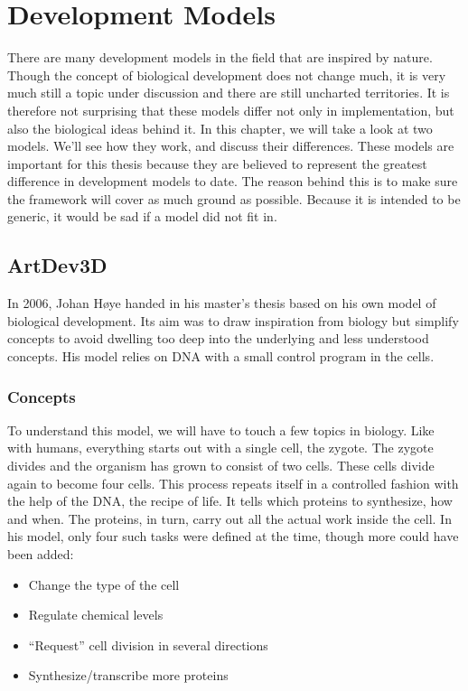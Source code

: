 \section{Development Models}
There are many development models in the field that are inspired by nature. Though the concept of biological development does not change much, it is very much still a topic under discussion and there are still uncharted territories. It is therefore not surprising that these models differ not only in implementation, but also the biological ideas behind it. In this chapter, we will take a look at two models. We'll see how they work, and discuss their differences. These models are important for this thesis because they are believed to represent the greatest difference in development models to date. The reason behind this is to make sure the framework will cover as much ground as possible. Because it is intended to be generic, it would be sad if a model did not fit in.

\subsection{ArtDev3D}
\label{sec:Models:ArtDev3D}
In 2006, Johan H{\o}ye handed in his master's thesis\cite{hoye2006} based on his own model of biological development. Its aim was to draw inspiration from biology but simplify concepts to avoid dwelling too deep into the underlying and less understood concepts. His model relies on DNA with a small control program in the cells.

\subsubsection{Concepts}
To understand this model, we will have to touch a few topics in biology. Like with humans, everything starts out with a single cell, the zygote. The zygote divides and the organism has grown to consist of two cells. These cells divide again to become four cells. This process repeats itself in a controlled fashion with the help of the DNA, the recipe of life. It tells which proteins to synthesize, how and when. The proteins, in turn, carry out all the actual work inside the cell. In his model, only four such tasks were defined at the time, though more could have been added:

\begin{itemize}
	\itemsep=0pt
	\item Change the type of the cell
	\item Regulate chemical levels
	\item ``Request'' cell division in several directions
	\item Synthesize/transcribe more proteins
\end{itemize}

